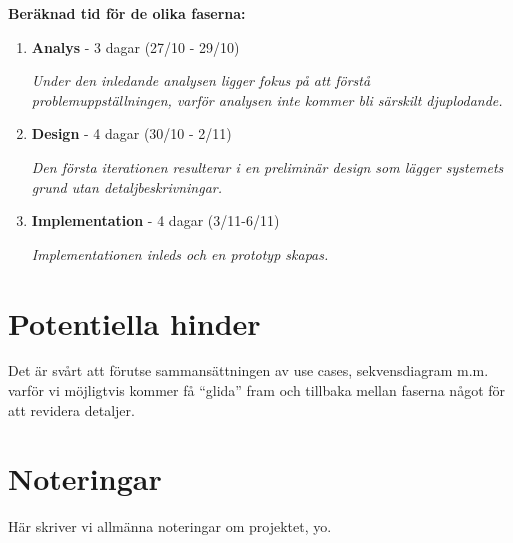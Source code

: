 \documentclass[a4paper]{article}
\begin{document}
    \textbf{Beräknad tid för de olika faserna:}

    \begin{enumerate}
        \item \textbf{Analys} - 3 dagar (27/10 - 29/10)

              \textit{Under den inledande analysen ligger fokus på att förstå
                      problemuppställningen, varför analysen inte kommer bli
                      särskilt djuplodande.}

        \item \textbf{Design} - 4 dagar (30/10 - 2/11)

              \textit{Den första iterationen resulterar i en preliminär design
                      som lägger systemets grund utan detaljbeskrivningar.}

        \item \textbf{Implementation} - 4 dagar (3/11-6/11)

              \textit{Implementationen inleds och en prototyp skapas.}
    \end{enumerate}

    \section{Potentiella hinder}

    Det är svårt att förutse sammansättningen av use cases, sekvensdiagram m.m.
    varför vi möjligtvis kommer få ``glida'' fram och tillbaka mellan faserna
    något för att revidera detaljer.

    \section{Noteringar}

    Här skriver vi allmänna noteringar om projektet, yo.
\end{document}
